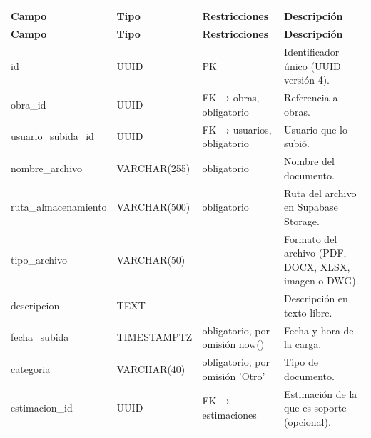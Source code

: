 \begin{xltabular}{\linewidth}{@{}>{\ttfamily\footnotesize}p{4.9cm}>{\ttfamily\footnotesize}p{2.4cm}>{\raggedright\arraybackslash\footnotesize}p{3.3cm}>{\footnotesize}X@{}}
\toprule\normalfont\sffamily\bfseries\footnotesize Campo & \normalfont\sffamily\bfseries\footnotesize Tipo & \sffamily\bfseries Restricciones & \sffamily\bfseries Descripción\\\midrule\endfirsthead
\toprule\normalfont\sffamily\bfseries\footnotesize Campo & \normalfont\sffamily\bfseries\footnotesize Tipo & \sffamily\bfseries Restricciones & \sffamily\bfseries Descripción\\\midrule\endhead
\bottomrule\endfoot
id & UUID & PK & Identificador único (UUID versión 4).\\
obra\_id & UUID & FK → obras, obligatorio & Referencia a obras.\\
usuario\_subida\_id & UUID & FK → usuarios, obligatorio & Usuario que lo subió.\\
nombre\_archivo & VARCHAR(255) & obligatorio & Nombre del documento.\\
ruta\_almacenamiento & VARCHAR(500) & obligatorio & Ruta del archivo en Supabase Storage.\\
tipo\_archivo & VARCHAR(50) &  & Formato del archivo (PDF, DOCX, XLSX, imagen o DWG).\\
descripcion & TEXT &  & Descripción en texto libre.\\
fecha\_subida & TIMESTAMPTZ & obligatorio, por omisión now() & Fecha y hora de la carga.\\
categoria & VARCHAR(40) & obligatorio, por omisión 'Otro' & Tipo de documento.\\
estimacion\_id & UUID & FK → estimaciones & Estimación de la que es soporte (opcional).\\
\end{xltabular}

